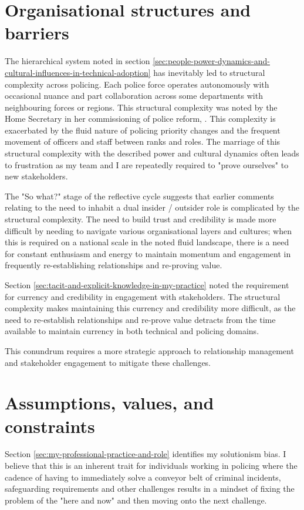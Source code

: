 \documentclass[12pt,a4paper,oneside]{report}
\begin{document}
\section{Organisational structures and barriers} 
\label{sec:organisational-structures-and-barriers}
The hierarchical system noted in section \ref{sec:people-power-dynamics-and-cultural-influences-in-technical-adoption} has inevitably led to structural complexity across policing.  Each police force operates autonomously with occasional nuance and part collaboration across some departments with neighbouring forces or regions.  This structural complexity was noted by the Home Secretary in her commissioning of police reform, \citep{homeoffice2024reform}.  This complexity is exacerbated by the fluid nature of policing priority changes and the frequent movement of officers and staff between ranks and roles.  The marriage of this structural complexity with the described power and cultural dynamics often leads to frustration as my team and I are repeatedly required to "prove ourselves" to new stakeholders.  

The "So what?" stage of the reflective cycle suggests that earlier comments relating to the need to inhabit a dual insider / outsider role is complicated by the structural complexity.  The need to build trust and credibility is made more difficult by needing to navigate various organisational layers and cultures; when this is required on a national scale in the noted fluid landscape, there is a need for constant enthusiasm and energy to maintain momentum and engagement in frequently re-establishing relationships and re-proving value.

Section \ref{sec:tacit-and-explicit-knowledge-in-my-practice} noted the requirement for currency and credibility in engagement with stakeholders.  The structural complexity makes maintaining this currency and credibility more difficult, as the need to re-establish relationships and re-prove value detracts from the time available to maintain currency in both technical and policing domains.

This conundrum requires a more strategic approach to relationship management and stakeholder engagement to mitigate these challenges.

\section{Assumptions, values, and constraints} 
\label{sec:assumptions-values-and-constraints}
Section \ref{sec:my-professional-practice-and-role} identifies my solutionism bias.  I believe that this is an inherent trait for individuals working in policing where the cadence of having to immediately solve a conveyor belt of criminal incidents, safeguarding requirements and other challenges results in a mindset of fixing the problem of the "here and now" and then moving onto the next challenge.
\end{document}
